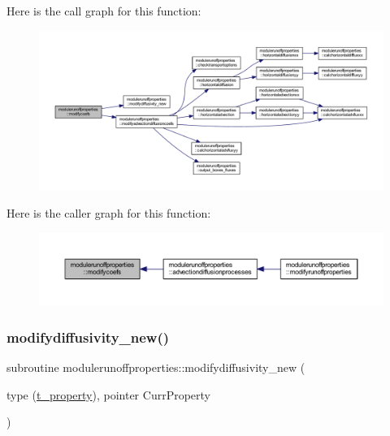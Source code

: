 Here is the call graph for this function\+:\nopagebreak
\begin{figure}[H]
\begin{center}
\leavevmode
\includegraphics[width=350pt]{namespacemodulerunoffproperties_ab43247d321857ac09aa5d9ef97891cd1_cgraph}
\end{center}
\end{figure}
Here is the caller graph for this function\+:\nopagebreak
\begin{figure}[H]
\begin{center}
\leavevmode
\includegraphics[width=350pt]{namespacemodulerunoffproperties_ab43247d321857ac09aa5d9ef97891cd1_icgraph}
\end{center}
\end{figure}
\mbox{\label{namespacemodulerunoffproperties_abb384a4ec2ef0d9cc812459889ee8063}} 
\subsubsection{\texorpdfstring{modifydiffusivity\+\_\+new()}{modifydiffusivity\_new()}}
{\footnotesize\ttfamily subroutine modulerunoffproperties\+::modifydiffusivity\+\_\+new (\begin{DoxyParamCaption}\item[{type (\mbox{\hyperlink{structmodulerunoffproperties_1_1t__property}{t\+\_\+property}}), pointer}]{Curr\+Property }\end{DoxyParamCaption})\hspace{0.3cm}{\ttfamily [private]}}

